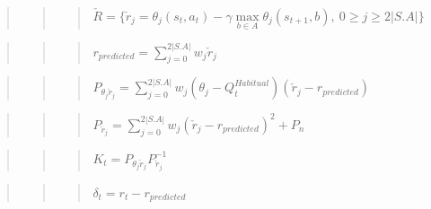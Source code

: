 \documentclass[10pt,a4paper,onecolumn]{article}
\begin{document}
\begin{quote}
\begin{quote}
\begin{quote}
\(\check{R} = \{ \check{r}_j = \theta_j(s_t,a_t) - \gamma \max\limits_{b \in A} \theta_j(s_{t+1},b),\ 0 \geq j \geq 2|S.A|\}\)
\end{quote}
\end{quote}
\end{quote}

\begin{quote}
\begin{quote}
\begin{quote}
\(r_{predicted} = \sum\limits_{j=0}^{2|S.A|} w_j \check{r}_j\)
\end{quote}
\end{quote}
\end{quote}

\begin{quote}
\begin{quote}
\begin{quote}
\(P_{\theta_j \check{r}_j} = \sum\limits_{j=0}^{2|S.A|} w_j (\theta_j - Q^{Habitual}_t)(\check{r}_j - r_{predicted})\)
\end{quote}
\end{quote}
\end{quote}

\begin{quote}
\begin{quote}
\begin{quote}
\(P_{\check{r}_j} = \sum\limits_{j=0}^{2|S.A|} w_j (\check{r}_j - r_{predicted})^2 + P_n\)
\end{quote}
\end{quote}
\end{quote}

\begin{quote}
\begin{quote}
\begin{quote}
\(K_t = P_{\theta_j \check{r}_j} P_{\check{r}_j}^{-1}\)
\end{quote}
\end{quote}
\end{quote}

\begin{quote}
\begin{quote}
\begin{quote}
\(\delta_t = r_t - r_{predicted}\)
\end{quote}
\end{quote}
\end{quote}
\end{document}
